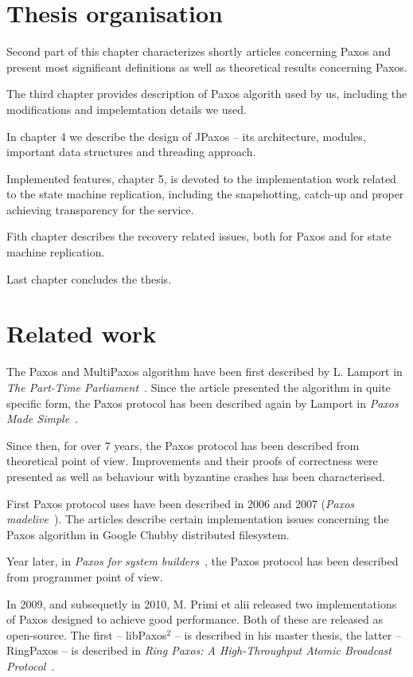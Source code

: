 \section{Thesis organisation}
Second part of this chapter characterizes shortly articles concerning Paxos and present most significant definitions as well as theoretical results concerning Paxos.

The third chapter provides description of Paxos algorith used by us, including the modifications and impelemtation details we used.

In chapter 4 we describe the design of JPaxos -- its architecture, modules, important data structures and threading approach.

Implemented features, chapter 5, is devoted to the implementation work related to the state machine replication, including the snapshotting, catch-up and proper achieving transparency for the service.

Fith chapter describes the recovery related issues, both for Paxos and for state machine replication.

Last chapter concludes the thesis. %

\section{Related work}

The Paxos and MultiPaxos algorithm have been first described by L. Lamport in \textit{The Part-Time Parliament}~\cite{Lam98}. Since the article presented the algorithm in quite specific form, the Paxos protocol has been described again by Lamport in \textit{Paxos Made Simple}~\cite{Lam01}.

Since then, for over 7 years, the Paxos protocol has been described from theoretical point of view. Improvements and their proofs of correctness were presented as well as behaviour with byzantine crashes has been characterised.

First Paxos protocol uses have been described in 2006 and 2007 (\textit{Paxos made\linebreak live}~\cite{CGR07}). The articles describe certain implementation issues concerning the Paxos algorithm in Google Chubby distributed filesystem.

Year later, in \textit{Paxos for system builders}~\cite{AK08}, the Paxos protocol has been described from programmer point of view.

In 2009, and subsequetly in 2010, M. Primi et alii released two implementations of Paxos designed to achieve good performance. Both of these are released as open-source. The first -- libPaxos$^2$ -- is described in his master thesis, the latter -- RingPaxos -- is described in \textit{Ring Paxos: A High-Throughput Atomic Broadcast Protocol}~\cite{Mar10}.

